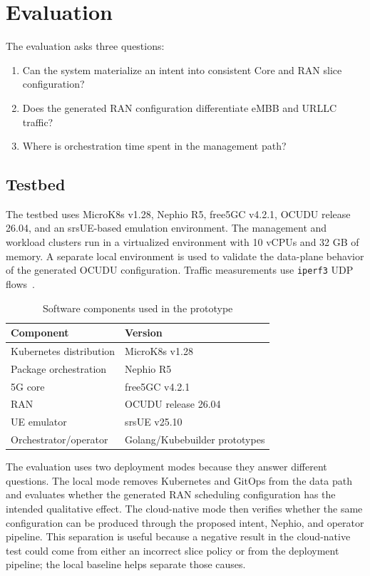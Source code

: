 ﻿\section{Evaluation}
\label{sec:evaluation}

The evaluation asks three questions:
\begin{enumerate}
  \item Can the system materialize an intent into consistent Core and RAN slice configuration?
  \item Does the generated RAN configuration differentiate eMBB and URLLC traffic?
  \item Where is orchestration time spent in the management path?
\end{enumerate}

\subsection{Testbed}

The testbed uses MicroK8s v1.28, Nephio R5, free5GC v4.2.1, OCUDU release 26.04, and an srsUE-based emulation environment. The management and workload clusters run in a virtualized environment with 10 vCPUs and 32 GB of memory. A separate local environment is used to validate the data-plane behavior of the generated OCUDU configuration. Traffic measurements use \texttt{iperf3} UDP flows~\cite{iperf3_manual}.

\begin{table}[t]
  \caption{Software components used in the prototype}
  \label{tab:software}
  \begin{tabular}{ll}
    \toprule
    Component & Version \\
    \midrule
    Kubernetes distribution & MicroK8s v1.28 \\
    Package orchestration & Nephio R5 \\
    5G core & free5GC v4.2.1 \\
    RAN & OCUDU release 26.04 \\
    UE emulator & srsUE v25.10 \\
    Orchestrator/operator & Golang/Kubebuilder prototypes \\
    \bottomrule
  \end{tabular}
\end{table}

The evaluation uses two deployment modes because they answer different questions. The local mode removes Kubernetes and GitOps from the data path and evaluates whether the generated RAN scheduling configuration has the intended qualitative effect. The cloud-native mode then verifies whether the same configuration can be produced through the proposed intent, Nephio, and operator pipeline. This separation is useful because a negative result in the cloud-native test could come from either an incorrect slice policy or from the deployment pipeline; the local baseline helps separate those causes.

